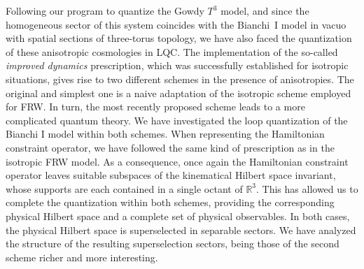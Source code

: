 Following our program to quantize the Gowdy $T^3$ model, and since the homogeneous sector of this
system coincides with the Bianchi~I model in vacuo with spatial sections of three-torus topology, we
have also faced the quantization of these anisotropic cosmologies in LQC. The implementation of the
so-called \emph{improved dynamics} prescription, which was successfully established for isotropic
situations, gives rise to two different schemes in the presence of anisotropies. The original and
simplest one is a naive adaptation of the isotropic scheme employed for FRW. In turn, the most
recently proposed scheme leads to a more complicated quantum theory. We have investigated the loop
quantization of the Bianchi I model within both
schemes. When representing the Hamiltonian constraint operator, we have followed the same kind of
prescription as in the isotropic FRW model. As a consequence, once again the Hamiltonian constraint
operator leaves suitable subspaces of the kinematical Hilbert space invariant, whose
supports are each contained in a single octant of $\mathbb{R}^3$. This has allowed us to
complete the quantization within both schemes, providing the corresponding physical Hilbert space
and a complete set of physical observables. In both cases, the physical Hilbert space is
superselected in separable sectors. We have analyzed the structure of the resulting superselection
sectors, being those of the second scheme richer and more interesting.

